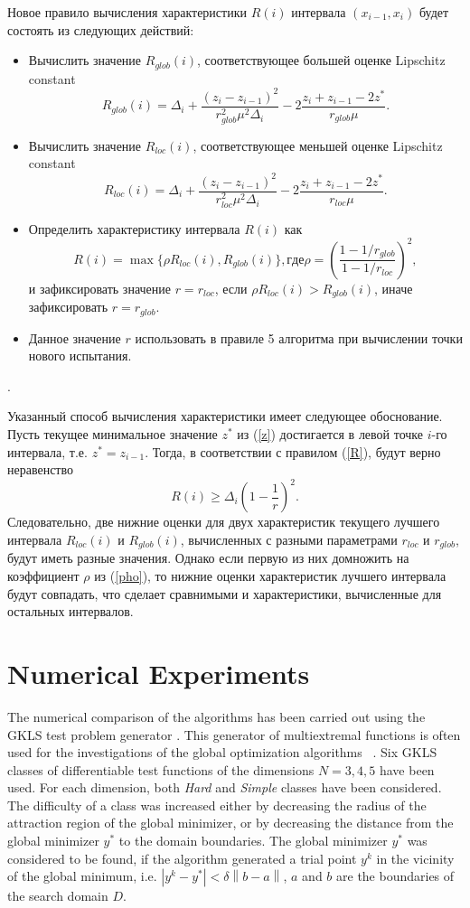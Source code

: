 \documentclass[runningheads]{llncs}
\begin{document}
Новое правило вычисления характеристики $R(i)$ интервала $(x_{i-1}, x_i)$ будет состоять из следующих действий:
\begin{itemize}
\item
Вычислить значение $R_{glob}(i)$, соответствующее большей оценке Lipschitz constant
\[
R_{glob}(i)=\Delta_i+\frac{(z_i-z_{i-1})^2}{r_{glob}^2\mu^2\Delta_i}-2\frac{z_i+z_{i-1}-2z^*}{r_{glob}\mu}.
\]
\item
Вычислить значение $R_{loc}(i)$, соответствующее меньшей оценке Lipschitz constant
\[
R_{loc}(i)=\Delta_i+\frac{(z_i-z_{i-1})^2}{r_{loc}^2\mu^2\Delta_i}-2\frac{z_i+z_{i-1}-2z^*}{r_{loc}\mu}.
\]
\item
Определить характеристику интервала $R(i)$ как
\begin{equation}\label{pho}
R(i) = \max\{\rho R_{loc}(i),R_{glob}(i)\}, где \rho = \left(\frac{1-1/r_{glob}}{1-1/r_{loc}}\right)^2,
\end{equation}
и зафиксировать значение $r = r_{loc}$, если  $\rho R_{loc}(i) > R_{glob}(i)$, иначе зафиксировать $r=r_{glob}$.
\item
Данное значение $r$ использовать в правиле 5 алгоритма при вычислении точки нового испытания.   
\end{itemize}.

Указанный способ вычисления характеристики имеет следующее обоснование. 
Пусть текущее минимальное значение $z^*$ из (\ref{z}) достигается в левой точке $i$-го интервала, т.е. $z^* = z_{i-1}$. Тогда, в соответствии с правилом (\ref{R}), будут верно неравенство
\[
R(i) \geq \Delta_i \left( 1 - \frac{1}{r} \right)^2.
\]
Следовательно, две нижние оценки для двух характеристик текущего лучшего интервала $R_{loc}(i)$ и $R_{glob}(i)$, вычисленных с разными параметрами $r_{loc}$ и $r_{glob}$, будут иметь разные значения.
Однако если первую из них домножить на коэффициент $\rho$ из (\ref{pho}), то нижние оценки характеристик лучшего интервала будут совпадать, что сделает сравнимыми и характеристики, вычисленные для остальных интервалов.

\section{Numerical Experiments}

The numerical comparison of the algorithms has been carried out using the GKLS 
test problem generator \cite{Gaviano2003}. 
This generator of multiextremal functions is often used for the investigations of the global 
optimization algorithms ~\cite{Barkalov2018,Paulavicius2014,Sergeyev2015}.
Six GKLS classes of differentiable test functions of the dimensions $N = 3,4,5$
have been used. For each dimension, both \textit{Hard} and \textit{Simple}
classes have been considered. The difficulty of a class was increased either by
decreasing the radius of the attraction region of the global minimizer, or by
decreasing the distance from the global minimizer $y^\ast$ to the domain
boundaries. The global minimizer $y^\ast$ was considered to be found, if the
algorithm generated a trial point $y^k$ in the vicinity of the global minimum,
i.e. $\left|y^k-y^\ast\right| <\delta\left\|b-a\right\|$, 
$a$ and $b$ are the boundaries of the search domain $D$. 
\end{document}
